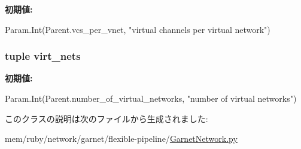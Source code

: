 \label{classGarnetNetwork_1_1GarnetRouter_a2bb2221cda9b94b6a0c2944d8a12f31e}
{\bfseries 初期値:}
\begin{DoxyCode}
Param.Int(Parent.vcs_per_vnet,
                              "virtual channels per virtual network")
\end{DoxyCode}
\hypertarget{classGarnetNetwork_1_1GarnetRouter_a84c7a415611bc1b55aa5e7fd9e9601e8}{
\subsubsection[{virt\_\-nets}]{\setlength{\rightskip}{0pt plus 5cm}tuple {\bf virt\_\-nets}}}
\label{classGarnetNetwork_1_1GarnetRouter_a84c7a415611bc1b55aa5e7fd9e9601e8}
{\bfseries 初期値:}
\begin{DoxyCode}
Param.Int(Parent.number_of_virtual_networks,
                          "number of virtual networks")
\end{DoxyCode}


このクラスの説明は次のファイルから生成されました:\begin{DoxyCompactItemize}
\item 
mem/ruby/network/garnet/flexible-\/pipeline/\hyperlink{GarnetNetwork_8py}{GarnetNetwork.py}\end{DoxyCompactItemize}
